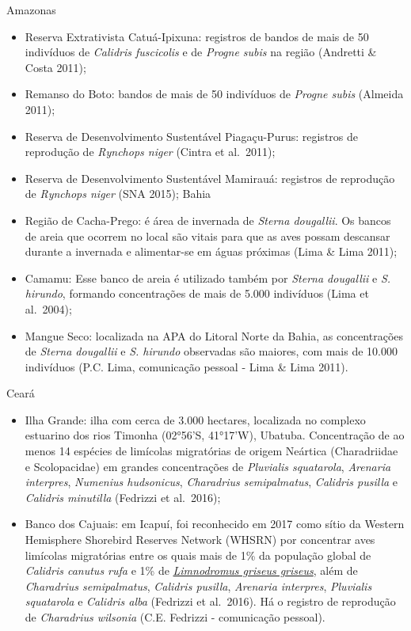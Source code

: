 \documentclass[
]{scrbook}
\begin{document}
Amazonas

\begin{itemize}
\item
  Reserva Extrativista Catuá-Ipixuna: registros de bandos de mais de 50 indivíduos de \emph{Calidris fuscicolis} e de \emph{Progne subis} na região (Andretti \& Costa 2011);
\item
  Remanso do Boto: bandos de mais de 50 indivíduos de \emph{Progne subis} (Almeida 2011);
\item
  Reserva de Desenvolvimento Sustentável Piagaçu-Purus: registros de reprodução de \emph{Rynchops niger} (Cintra et al.~2011);
\item
  Reserva de Desenvolvimento Sustentável Mamirauá: registros de reprodução de \emph{Rynchops niger} (SNA 2015);
  Bahia
\item
  Região de Cacha-Prego: é área de invernada de \emph{Sterna dougallii}. Os bancos de areia que ocorrem no local são vitais para que as aves possam descansar durante a invernada e alimentar-se em águas próximas (Lima \& Lima 2011);
\item
  Camamu: Esse banco de areia é utilizado também por \emph{Sterna dougallii} e \emph{S. hirundo}, formando concentrações de mais de 5.000 indivíduos (Lima et al.~2004);
\item
  Mangue Seco: localizada na APA do Litoral Norte da Bahia, as concentrações de \emph{Sterna dougallii} e \emph{S. hirundo} observadas são maiores, com mais de 10.000 indivíduos (P.C. Lima, comunicação pessoal - Lima \& Lima 2011).
\end{itemize}

Ceará

\begin{itemize}
\item
  Ilha Grande: ilha com cerca de 3.000 hectares, localizada no complexo estuarino dos rios Timonha (02°56'S, 41°17'W), Ubatuba. Concentração de ao menos 14 espécies de limícolas migratórias de origem Neártica (Charadriidae e Scolopacidae) em grandes concentrações de \emph{Pluvialis squatarola}, \emph{Arenaria interpres}, \emph{Numenius hudsonicus}, \emph{Charadrius semipalmatus}, \emph{Calidris pusilla} e \emph{Calidris minutilla} (Fedrizzi et al.~2016);
\item
  Banco dos Cajuais: em Icapuí, foi reconhecido em 2017 como sítio da Western Hemisphere Shorebird Reserves Network (WHSRN) por concentrar aves limícolas migratórias entre os quais mais de 1\% da população global de \emph{Calidris canutus rufa} e 1\% de \href{http://www.whsrn.org/banco-dos-cajuais}{\emph{Limnodromus griseus griseus}}, além de \emph{Charadrius semipalmatus}, \emph{Calidris pusilla}, \emph{Arenaria interpres}, \emph{Pluvialis squatarola} e \emph{Calidris alba} (Fedrizzi et al.~2016). Há o registro de reprodução de \emph{Charadrius wilsonia} (C.E. Fedrizzi - comunicação pessoal).
\end{itemize}
\end{document}
